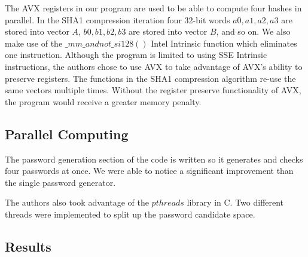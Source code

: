 \documentclass[letterpaper, 10 pt, conference]{ieeeconf}  %
\begin{document}
The AVX registers in our program are used to be able to compute four hashes in parallel.  In the SHA1 compression iteration four 32-bit words $a0, a1, a2, a3$ are stored into vector $A$, $b0, b1, b2, b3$ are stored into vector $B$, and so on.  We also make use of the $\_mm\_andnot\_si128()$ Intel Intrinsic function which eliminates one instruction.  Although the program is limited to using SSE Intrinsic instructions, the authors chose to use AVX to take advantage of AVX's ability to preserve registers.  The functions in the SHA1 compression algorithm re-use the same vectors multiple times.  Without the register preserve functionality of AVX, the program would receive a greater memory penalty.  

\subsection{Parallel Computing}

The password generation section of the code is written so it generates and checks four passwords at once.  We were able to notice a significant improvement than the single password generator.

The authors also took advantage of the $pthreads$ library in C.  Two different threads were implemented to split up the password candidate space. 

\subsection{Results}


      


\end{document}
